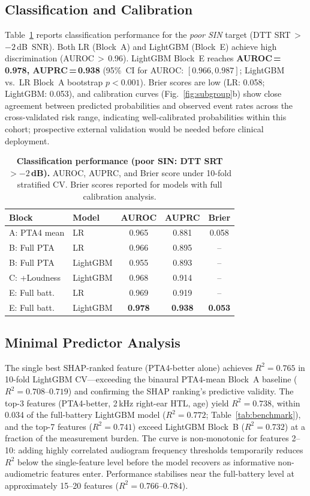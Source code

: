 \documentclass[12pt,a4paper]{article}
\begin{document}
\subsection{Classification and Calibration}

Table~\ref{tab:classification} reports classification performance for the
\textit{poor SIN} target (DTT SRT\,$>$\,$-2$\,dB~SNR).  Both LR (Block~A)
and LightGBM (Block~E) achieve high discrimination (AUROC\,$>$\,0.96).
LightGBM Block~E reaches \textbf{AUROC\,=\,0.978, AUPRC\,=\,0.938}
(95\%~CI for AUROC: $[0.966, 0.987]$; LightGBM vs.\ LR Block~A bootstrap
$p<0.001$).  Brier scores are low (LR: 0.058; LightGBM: 0.053), and
calibration curves (Fig.~\ref{fig:subgroup}b) show close agreement between
predicted probabilities and observed event rates across the cross-validated
risk range, indicating well-calibrated probabilities within this cohort;
prospective external validation would be needed before clinical deployment.

\begin{table}[htbp]
\caption{\textbf{Classification performance (poor SIN: DTT SRT $>-2$\,dB).}
AUROC, AUPRC, and Brier score under 10-fold stratified CV.  Brier scores
reported for models with full calibration analysis.}
\label{tab:classification}
\centering
\small
\begin{tabular}{llccc}
\toprule
Block & Model & AUROC & AUPRC & Brier \\
\midrule
A: PTA4 mean  & LR        & 0.965 & 0.881 & 0.058 \\
B: Full PTA   & LR        & 0.966 & 0.895 & --   \\
B: Full PTA   & LightGBM  & 0.955 & 0.893 & --   \\
C: +Loudness  & LightGBM  & 0.968 & 0.914 & --   \\
E: Full batt. & LR        & 0.969 & 0.919 & --   \\
E: Full batt. & LightGBM  & \textbf{0.978} & \textbf{0.938} & \textbf{0.053} \\
\bottomrule
\end{tabular}
\end{table}

\subsection{Minimal Predictor Analysis}

The single best SHAP-ranked feature (PTA4-better alone) achieves $R^2=0.765$
in 10-fold LightGBM CV---exceeding the binaural PTA4-mean Block~A baseline
($R^2=0.708$--$0.719$) and confirming the SHAP ranking's predictive validity.
The top-3 features (PTA4-better, 2\,kHz right-ear HTL, age) yield $R^2=0.738$,
within 0.034 of the full-battery LightGBM model ($R^2=0.772$; Table~\ref{tab:benchmark}), and the top-7
features ($R^2=0.741$) exceed LightGBM Block~B ($R^2=0.732$) at a fraction
of the measurement burden.  The curve is non-monotonic for features 2--10:
adding highly correlated audiogram frequency thresholds temporarily reduces
$R^2$ below the single-feature level before the model recovers as
informative non-audiometric features enter.  Performance stabilises near the
full-battery level at approximately 15--20 features ($R^2=0.766$--$0.784$).
\end{document}

